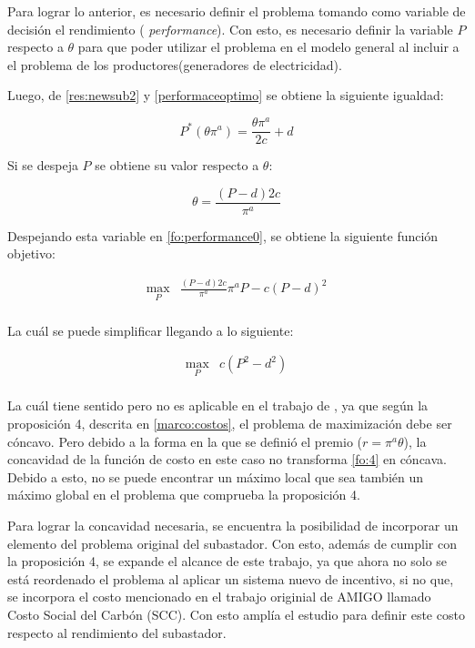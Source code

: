 Para lograr lo anterior, es necesario definir el problema tomando como variable de decisión el rendimiento ( \textit{performance}). Con esto, es necesario definir la variable $P$ respecto a $\theta$ para que poder utilizar el problema en el modelo general al incluir a el problema de los productores(generadores de electricidad).
\vspace{2.5mm}

Luego, de \ref{res:newsub2} y \ref{performaceoptimo} se obtiene la siguiente igualdad:

$$P^*(\theta \pi^a) = \frac{\theta \pi^a}{2c}+d$$

Si se despeja $P$ se obtiene su valor respecto a $\theta$:

$$\theta=\frac{(P-d)2c}{\pi^a}$$

Despejando esta variable en \ref{fo:performance0}, se obtiene la siguiente función objetivo:


\begin{equation}
\begin{array}{rrclcl}
    \displaystyle \max_{P} & \frac{(P-d)2c}{\pi^a} \pi^{a}P - c(P-d)^2  \label{fo:3}\\
\end{array}
\end{equation}

La cuál se puede simplificar llegando a lo siguiente:

\begin{equation}
\begin{array}{rrclcl}
    \displaystyle \max_{P} & c(P^{2}-d^{2}) \label{fo:4}\\
\end{array}
\end{equation}

La cuál tiene sentido pero no es aplicable en el trabajo de , ya que según la proposición 4, descrita en \ref{marco:costos}, el problema de maximización debe ser cóncavo. Pero debido a la forma en la que se definió el premio ($r=\pi^{a}\theta$), la concavidad de la función de costo en este caso no transforma \ref{fo:4} en cóncava. Debido a esto, no se puede encontrar un máximo local que sea también un máximo global en el problema que comprueba la proposición 4.
\vspace{2.5mm}


Para lograr la concavidad necesaria, se encuentra la posibilidad de incorporar un elemento del problema original del subastador. Con esto, además de cumplir con la proposición 4, se expande el alcance de este trabajo, ya que ahora no solo se está reordenado el problema al aplicar un sistema nuevo de incentivo, si no que, se incorpora el costo mencionado en el trabajo originial de AMIGO llamado Costo Social del Carbón (SCC). Con esto amplía el estudio para definir este costo respecto al rendimiento del subastador.
\vspace{2.5mm}

